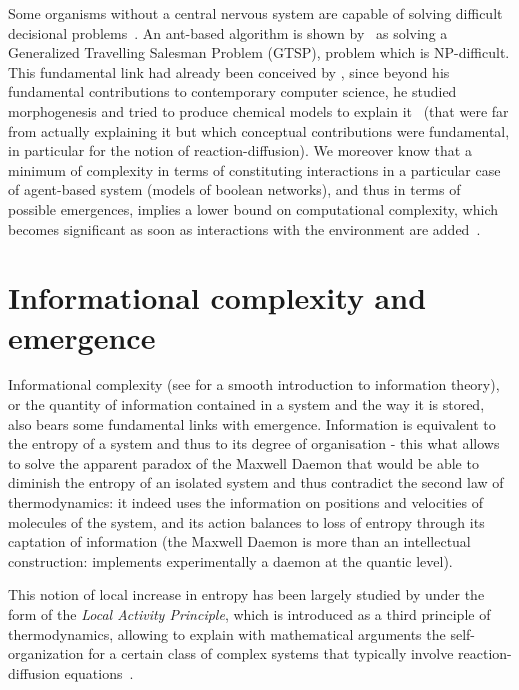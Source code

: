 Some organisms without a central nervous system are capable of solving difficult decisional problems~\cite{reid2016decision}. An ant-based algorithm is shown by~\cite{Pintea2017} as solving a Generalized Travelling Salesman Problem (GTSP), problem which is NP-difficult. This fundamental link had already been conceived by , since beyond his fundamental contributions to contemporary computer science, he studied morphogenesis and tried to produce chemical models to explain it~\cite{turing1952chemical} (that were far from actually explaining it but which conceptual contributions were fundamental, in particular for the notion of reaction-diffusion). We moreover know that a minimum of complexity in terms of constituting interactions in a particular case of agent-based system (models of boolean networks), and thus in terms of possible emergences, implies a lower bound on computational complexity, which becomes significant as soon as interactions with the environment are added~\cite{tovsic2017boolean}.








\section{Informational complexity and emergence}




Informational complexity (see \cite{dedeo2016information} for a smooth introduction to information theory), or the quantity of information contained in a system and the way it is stored, also bears some fundamental links with emergence. Information is equivalent to the entropy of a system and thus to its degree of organisation - this what allows to solve the apparent paradox of the Maxwell Daemon that would be able to diminish the entropy of an isolated system and thus contradict the second law of thermodynamics: it indeed uses the information on positions and velocities of molecules of the system, and its action balances to loss of entropy through its captation of information (the Maxwell Daemon is more than an intellectual construction: \cite{cottet2017observing} implements experimentally a daemon at the quantic level).

This notion of local increase in entropy has been largely studied by  under the form of the \emph{Local Activity Principle}, which is introduced as a third principle of thermodynamics, allowing to explain with mathematical arguments the self-organization for a certain class of complex systems that typically involve reaction-diffusion equations~\cite{mainzer2013local}.


